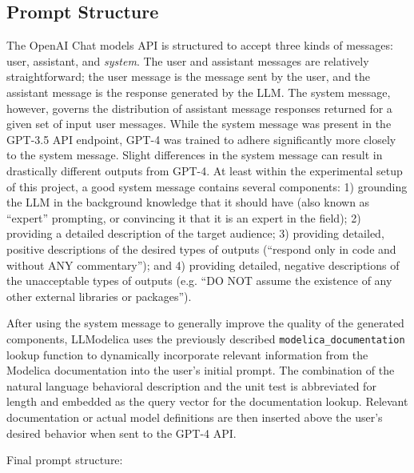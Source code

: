 \documentclass[11pt]{article}
\begin{document}
\subsection{Prompt Structure}
\label{sec:org21961f0}
The OpenAI Chat models API is structured to accept three kinds of messages: user, assistant, and \emph{system}. The user and assistant messages are relatively straightforward; the user message is the message sent by the user, and the assistant message is the response generated by the LLM. The system message, however, governs the distribution of assistant message responses returned for a given set of input user messages. While the system message was present in the GPT-3.5 API endpoint, GPT-4 was trained to adhere significantly more closely to the system message. Slight differences in the system message can result in drastically different outputs from GPT-4. At least within the experimental setup of this project, a good system message contains several components: 1) grounding the LLM in the background knowledge that it should have (also known as ``expert'' prompting, or convincing it that it is an expert in the field); 2) providing a detailed description of the target audience; 3) providing detailed, positive descriptions of the desired types of outputs (``respond only in code and without ANY commentary''); and 4) providing detailed, negative descriptions of the unacceptable types of outputs (e.g. ``DO NOT assume the existence of any other external libraries or packages'').

After using the system message to generally improve the quality of the generated components, LLModelica uses the previously described \texttt{modelica\_documentation} lookup function to dynamically incorporate relevant information from the Modelica documentation into the user's initial prompt. The combination of the natural language behavioral description and the unit test is abbreviated for length and embedded as the query vector for the documentation lookup. Relevant documentation or actual model definitions are then inserted above the user's desired behavior when sent to the GPT-4 API.

Final prompt structure:
\end{document}
